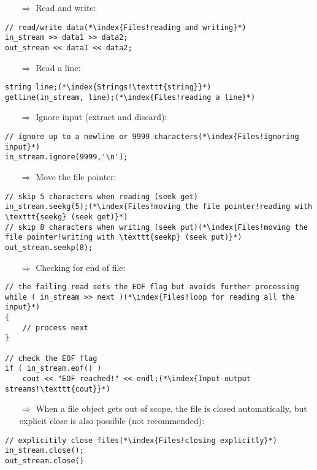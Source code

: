 \documentclass[10pt]{article}
\begin{document}
\begin{enumerate}
\item[$\Rightarrow$] Read and write:
\end{enumerate}
\begin{lstlisting}
// read/write data(*\index{Files!reading and writing}*)
in_stream >> data1 >> data2;
out_stream << data1 << data2;
\end{lstlisting}
\begin{enumerate}
\item[$\Rightarrow$] Read a line:
\end{enumerate}
\begin{lstlisting}
string line;(*\index{Strings!\texttt{string}}*)
getline(in_stream, line);(*\index{Files!reading a line}*)
\end{lstlisting}
\begin{enumerate}
\item[$\Rightarrow$] Ignore input (extract and discard):
\end{enumerate}
\begin{lstlisting}
// ignore up to a newline or 9999 characters(*\index{Files!ignoring input}*)
in_stream.ignore(9999,'\n');
\end{lstlisting}
\begin{enumerate}
\item[$\Rightarrow$] Move the file pointer:
\end{enumerate}
\begin{lstlisting}
// skip 5 characters when reading (seek get)
in_stream.seekg(5);(*\index{Files!moving the file pointer!reading with \texttt{seekg} (seek get)}*)
// skip 8 characters when writing (seek put)(*\index{Files!moving the file pointer!writing with \texttt{seekp} (seek put)}*)
out_stream.seekp(8);
\end{lstlisting}
\begin{enumerate}
\item[$\Rightarrow$] Checking for end of file:
\end{enumerate}
\begin{lstlisting}
// the failing read sets the EOF flag but avoids further processing
while ( in_stream >> next )(*\index{Files!loop for reading all the input}*)
{
    // process next
}

// check the EOF flag
if ( in_stream.eof() )
    cout << "EOF reached!" << endl;(*\index{Input-output streams!\texttt{cout}}*)
\end{lstlisting}
\begin{enumerate}
\item[$\Rightarrow$] When a file object gets out of scope, the file is closed automatically, but explicit
close is also possible (not recommended):
\end{enumerate}
\begin{lstlisting}
// explicitily close files(*\index{Files!closing explicitly}*)
in_stream.close();
out_stream.close()
\end{lstlisting}
%
%
\end{document}
